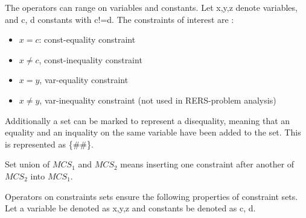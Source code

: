 The operators can range on variables and constants. Let x,y,z denote variables, and c, d constants with c!=d.
The constraints of interest are : 
\begin{itemize}
\item $x=c$: const-equality constraint
\item $x\neq c$, const-inequality constraint
\item $x=y$, var-equality constraint
\item $x\neq y$, var-inequality constraint (not used in RERS-problem analysis)
\end{itemize}

Additionally a set can be marked to represent a disequality, meaning that an equality and an inquality on the same variable have been added to the set. This is represented as \{\#\#\}.

Set union of $MCS_1$ and $MCS_2$ means inserting one constraint after another of $MCS_2$ into $MCS_1$.

Operators on constraints sets ensure the following properties of
constraint sets. Let a variable be denoted as x,y,z and constants be denoted as c, d.

